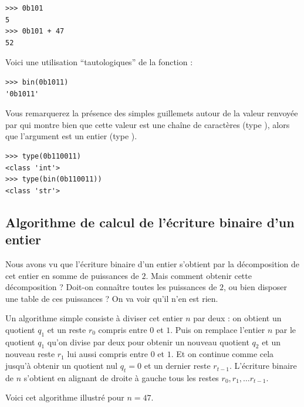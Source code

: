 \documentclass[class=report,crop=false]{standalone}
\begin{document}
\begin{lstlisting}
>>> 0b101
5
>>> 0b101 + 47
52 
\end{lstlisting}




\begin{remarque*}
Voici une utilisation ``tautologiques'' de la fonction  :
\begin{lstlisting}
>>> bin(0b1011)
'0b1011'
\end{lstlisting} 
Vous remarquerez la présence des simples guillemets autour de la valeur
renvoyée par  qui montre bien que cette valeur est une
chaîne de caractères (type ), alors que l'argument est un
entier (type ).

\begin{lstlisting}
>>> type(0b110011)
<class 'int'>
>>> type(bin(0b110011))
<class 'str'> 
\end{lstlisting} 
\end{remarque*}



\subsection{Algorithme de calcul de l'écriture binaire d'un entier}

Nous avons vu que l'écriture binaire d'un entier s'obtient par la
décomposition de cet entier en somme de puissances de $2$. Mais comment
obtenir cette décomposition ? Doit-on connaître toutes les puissances de
$2$, ou bien disposer une table de ces puissances ? On va voir qu'il n'en
est rien.

Un algorithme simple consiste à diviser cet entier $n$ par deux : on
obtient un quotient $q_1$ et un reste $r_0$ compris entre $0$ et $1$. Puis
on remplace l'entier $n$ par le quotient $q_1$ qu'on divise par deux
pour obtenir un nouveau quotient $q_2$ et un nouveau reste $r_1$ lui
aussi compris entre $0$ et $1$. Et on continue comme cela jusqu'à obtenir un
quotient nul $q_t=0$ et un dernier reste $r_{t-1}$. L'écriture binaire
de $n$ s'obtient en alignant de droite à gauche tous les restes
$r_0, r_1, \ldots r_{t-1}$.

Voici cet algorithme illustré pour $n = 47$.
\end{document}
